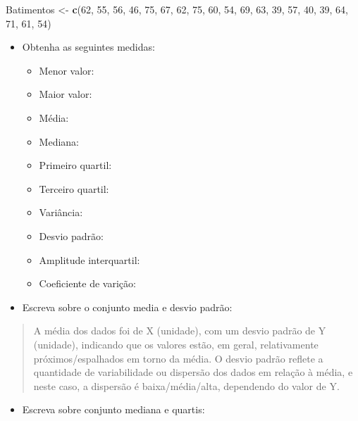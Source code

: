 \documentclass[
]{book}
\newenvironment{Shaded}{\begin{snugshade}}{\end{snugshade}}
\newcommand{\DecValTok}[1]{\textcolor[rgb]{0.00,0.00,0.81}{#1}}
\newcommand{\FunctionTok}[1]{\textcolor[rgb]{0.13,0.29,0.53}{\textbf{#1}}}
\newcommand{\NormalTok}[1]{#1}
\newcommand{\OtherTok}[1]{\textcolor[rgb]{0.56,0.35,0.01}{#1}}
\providecommand{\tightlist}{%
  \setlength{\itemsep}{0pt}\setlength{\parskip}{0pt}}
\begin{document}
\begin{Shaded}
\begin{Highlighting}[]
\NormalTok{Batimentos }\OtherTok{\textless{}{-}} \FunctionTok{c}\NormalTok{(}\DecValTok{62}\NormalTok{, }\DecValTok{55}\NormalTok{, }\DecValTok{56}\NormalTok{, }\DecValTok{46}\NormalTok{, }\DecValTok{75}\NormalTok{, }\DecValTok{67}\NormalTok{, }\DecValTok{62}\NormalTok{, }\DecValTok{75}\NormalTok{, }\DecValTok{60}\NormalTok{, }\DecValTok{54}\NormalTok{, }\DecValTok{69}\NormalTok{, }\DecValTok{63}\NormalTok{, }\DecValTok{39}\NormalTok{, }\DecValTok{57}\NormalTok{, }\DecValTok{40}\NormalTok{, }\DecValTok{39}\NormalTok{, }\DecValTok{64}\NormalTok{, }\DecValTok{71}\NormalTok{, }\DecValTok{61}\NormalTok{, }\DecValTok{54}\NormalTok{)}
\end{Highlighting}
\end{Shaded}

\begin{itemize}
\tightlist
\item
  Obtenha as seguintes medidas:

  \begin{itemize}
  \tightlist
  \item
    Menor valor:
  \item
    Maior valor:
  \item
    Média:
  \item
    Mediana:
  \item
    Primeiro quartil:
  \item
    Terceiro quartil:
  \item
    Variância:
  \item
    Desvio padrão:
  \item
    Amplitude interquartil:
  \item
    Coeficiente de varição:
  \end{itemize}
\item
  Escreva sobre o conjunto media e desvio padrão:
\end{itemize}

\begin{quote}
A média dos dados foi de X (unidade), com um desvio padrão de Y (unidade), indicando que os valores estão, em geral, relativamente próximos/espalhados em torno da média. O desvio padrão reflete a quantidade de variabilidade ou dispersão dos dados em relação à média, e neste caso, a dispersão é baixa/média/alta, dependendo do valor de Y.
\end{quote}

\begin{itemize}
\tightlist
\item
  Escreva sobre conjunto mediana e quartis:
\end{itemize}
\end{document}
